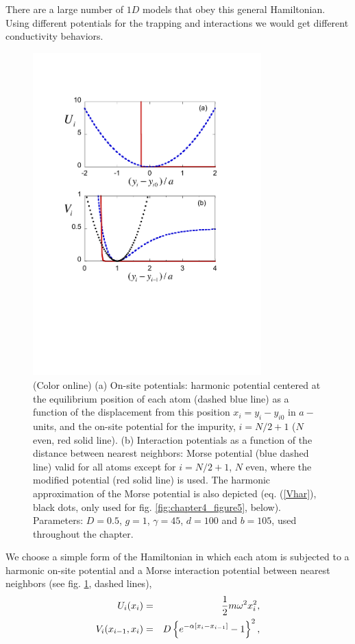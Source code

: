 There are a large number of $1D$ models that obey this general Hamiltonian. Using different potentials for the trapping and interactions we would get different conductivity behaviors.
\begin{figure}
\centering
\includegraphics[width=8.8cm]{Figures/FIG1.pdf}
\caption{(Color online) (a) On-site potentials: harmonic potential centered at the equilibrium position of each atom (dashed blue line) as a function of the displacement from this position $x_i=y_i-y_{i0}$ in $a-$units, and the on-site potential for the impurity, $i=N/2+1$
($N$ even, red solid line). (b) Interaction potentials as a function of the distance between nearest neighbors: Morse potential
(blue dashed line) valid for all atoms except for $i=N/2+1$, $N$ even, where the modified potential (red solid line) is used.
The harmonic approximation of the Morse potential is also depicted (eq. (\ref{Vhar}), black dots, only used for fig. \ref{fig:chapter4_figure5}, below).
Parameters: $D=0.5$, $g=1$, $\gamma = 45$, $d=100$ and $b=105$, used throughout the chapter.
}
\label{fig:chapter4_figure1}
\end{figure}
%
We choose a simple form of the Hamiltonian in
which each atom is subjected to a harmonic on-site potential and a Morse interaction potential between nearest neighbors (see fig. \ref{fig:chapter4_figure1}, dashed lines),
%
\begin{eqnarray}
\label{HO}
U_i(x_i)&=&{1 \over 2} m \omega^2 x^2_i,
\\
\label{IH}
V_i(x_{i-1},x_i)&=&D\left \{e^{-\alpha [x_i-x_{i-1}]}-1\right \}^2,
\end{eqnarray}
